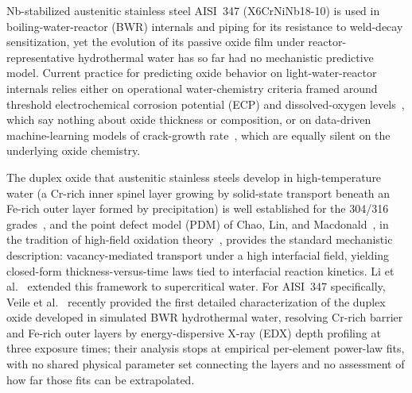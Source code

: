 \documentclass[pdflatex,sn-nature]{sn-jnl}
\begin{document}
Nb-stabilized austenitic stainless steel AISI~347 (X6CrNiNb18-10) is
used in boiling-water-reactor (BWR) internals and piping for its
resistance to weld-decay sensitization, yet the evolution of its passive
oxide film under reactor-representative hydrothermal water has so far
had no mechanistic predictive model. Current practice for predicting
oxide behavior on light-water-reactor internals relies either on
operational water-chemistry criteria framed around threshold
electrochemical corrosion potential (ECP) and dissolved-oxygen
levels~\citep{macdonald1992hwc,lin1996ecp,yeh1995damage1,yeh1996damage2},
which say nothing about oxide thickness or composition, or on
data-driven machine-learning models of crack-growth
rate~\citep{igscc_ml_uq2025}, which are equally silent on the underlying
oxide chemistry.

The duplex oxide that austenitic stainless steels develop in
high-temperature water (a Cr-rich inner spinel layer growing by
solid-state transport beneath an Fe-rich outer layer formed by
precipitation) is well established for the 304/316
grades~\citep{robertson1991mechanism,stellwag1998mechanism,ziemniak2002corrosion,kuang2010oxidation,terachi2008corrosion,kim1999oxide,lister1987release},
and the point defect model (PDM) of Chao, Lin, and
Macdonald~\citep{chao1981pdm1,lin1981pdm2,macdonald1992pdm,macdonald2011history},
in the tradition of high-field oxidation
theory~\citep{cabrera1949oxidation}, provides the standard mechanistic
description: vacancy-mediated transport under a high interfacial field,
yielding closed-form thickness-versus-time laws tied to interfacial
reaction kinetics. Li et al.~\citep{li2020scwpdm} extended this
framework to supercritical water. For AISI~347 specifically, Veile et
al.~\citep{veile2024} recently provided the first detailed
characterization of the duplex oxide developed in simulated BWR
hydrothermal water, resolving Cr-rich barrier and Fe-rich outer layers
by energy-dispersive X-ray (EDX) depth profiling at three exposure
times; their analysis stops at empirical per-element power-law fits,
with no shared physical parameter set connecting the layers and no
assessment of how far those fits can be extrapolated.
\end{document}

